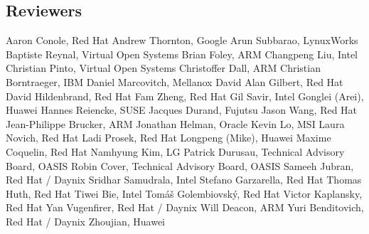 \subsection*{Reviewers}
Aaron Conole,	Red Hat	\newline
Andrew Thornton,  Google \newline
Arun Subbarao,	LynuxWorks	\newline
Baptiste Reynal,	Virtual Open Systems	\newline
Brian Foley,  ARM \newline
Changpeng Liu,	Intel	\newline
Christian Pinto,	Virtual Open Systems	\newline
Christoffer Dall,	ARM	\newline
Christian Borntraeger,	IBM	\newline
Daniel Marcovitch,	Mellanox	\newline
David Alan Gilbert, Red Hat \newline
David Hildenbrand,	Red Hat	\newline
Fam Zheng, Red Hat	\newline
Gil Savir,	Intel	\newline
Gonglei (Arei),	Huawei	\newline
Hannes Reiencke, SUSE	\newline
Jacques Durand,	Fujutsu	\newline
Jason Wang, Red Hat \newline
Jean-Philippe Brucker,	ARM	\newline
Jonathan Helman,	Oracle	\newline
Kevin Lo,	MSI	\newline
Laura Novich, Red Hat	\newline
Ladi Prosek,	Red Hat	\newline
Longpeng (Mike),	Huawei	\newline
Maxime Coquelin,	Red Hat	\newline
Namhyung Kim,	LG	\newline
Patrick Durusau,	Technical Advisory Board, OASIS	\newline
Robin Cover,	Technical Advisory Board, OASIS	\newline
Sameeh Jubran,	Red Hat / Daynix	\newline
Sridhar Samudrala,	Intel	\newline
Stefano Garzarella,	Red Hat	\newline
Thomas Huth,	Red Hat	\newline
Tiwei Bie,	Intel	\newline
Tomáš Golembiovský,	Red Hat	\newline
Victor Kaplansky,	Red Hat	\newline
Yan Vugenfirer, Red Hat / Daynix	\newline
Will Deacon,	ARM	\newline
Yuri Benditovich,	Red Hat / Daynix	\newline
Zhoujian,	Huawei	\newline
